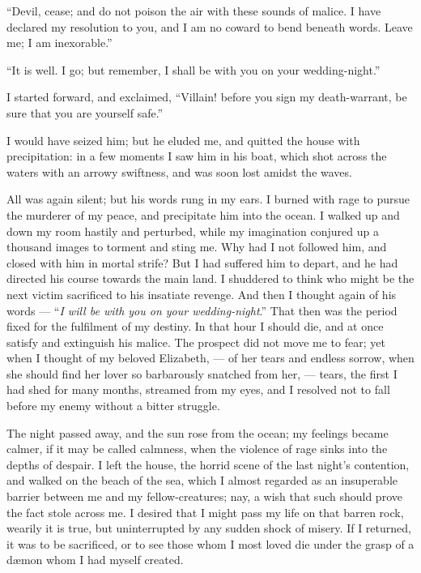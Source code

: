 ``Devil, cease; and do not poison
the air with these sounds of malice. I
have declared my resolution to you,
and I am no coward to bend beneath
words. Leave me; I am inexorable.''

``It is well. I go; but remember, I shall
be with you on your wedding-night.''

I started forward, and exclaimed,
``Villain! before you sign my death-warrant,
be sure that you are yourself
safe.''

I would have seized him; but he
eluded me, and quitted the house with
precipitation: in a few moments I saw
him in his boat, which shot across the
waters with an arrowy swiftness, and
was soon lost amidst the waves.

All was again silent; but his words
rung in my ears. I burned with rage
to pursue the murderer of my peace,
and precipitate him into the ocean. I
walked up and down my room hastily
and perturbed, while my imagination
conjured up a thousand images to torment
and sting me. Why had I not
followed him, and closed with him in
mortal strife? But I had suffered him
to depart, and he had directed his
course towards the main land. I shuddered
to think who might be the next
victim sacrificed to his insatiate revenge.
And then I thought again of
his words --- ``\emph{I will be with you on your
wedding-night}.'' That then was the
period fixed for the fulfilment of my
destiny. In that hour I should die,
and at once satisfy and extinguish his
malice. The prospect did not move
me to fear; yet when I thought of my
beloved Elizabeth, --- of her tears and
endless sorrow, when she should find
her lover so barbarously snatched from
her, --- tears, the first I had shed for
many months, streamed from my eyes,
and I resolved not to fall before my
enemy without a bitter struggle.

The night passed away, and the sun
rose from the ocean; my feelings became
calmer, if it may be called calmness,
when the violence of rage sinks
into the depths of despair. I left the
house, the horrid scene of the last
night's contention, and walked on the
beach of the sea, which I almost
regarded as an insuperable barrier between
me and my fellow-creatures;
nay, a wish that such should prove the
fact stole across me. I desired that I
might pass my life on that barren rock,
wearily it is true, but uninterrupted by
any sudden shock of misery. If I returned,
it was to be sacrificed, or to see
those whom I most loved die under the
grasp of a dæmon whom I had myself
created.

